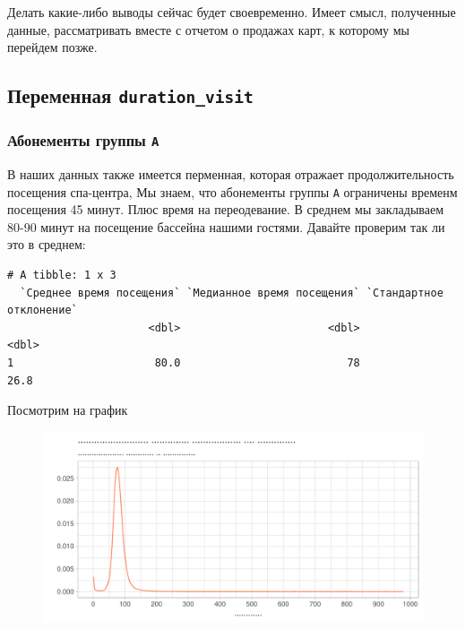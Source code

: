\documentclass[
  letterpaper,
  DIV=11,
  numbers=noendperiod]{scrartcl}
\begin{document}
Делать какие-либо выводы сейчас будет своевременно. Имеет смысл,
полученные данные, рассматривать вместе с отчетом о продажах карт, к
которому мы перейдем позже.

\hypertarget{ux43fux435ux440ux435ux43cux435ux43dux43dux430ux44f-duration_visit}{%
\subsection*{\texorpdfstring{Переменная
\texttt{duration\_visit}}{Переменная duration\_visit}}\label{ux43fux435ux440ux435ux43cux435ux43dux43dux430ux44f-duration_visit}}

\hypertarget{ux430ux431ux43eux43dux435ux43cux435ux43dux442ux44b-ux433ux440ux443ux43fux43fux44b-ux430}{%
\subsubsection*{\texorpdfstring{Абонементы группы
\texttt{А}}{Абонементы группы А}}\label{ux430ux431ux43eux43dux435ux43cux435ux43dux442ux44b-ux433ux440ux443ux43fux43fux44b-ux430}}

В наших данных также имеется перменная, которая отражает
продолжительность посещения спа-центра, Мы знаем, что абонементы группы
\texttt{А} ограничены временм посещения 45 минут. Плюс время на
переодевание. В среднем мы закладываем 80-90 минут на посещение бассейна
нашими гостями. Давайте проверим так ли это в среднем:

\begin{verbatim}
# A tibble: 1 x 3
  `Среднее время посещения` `Медианное время посещения` `Стандартное отклонение`
                      <dbl>                       <dbl>                    <dbl>
1                      80.0                          78                     26.8
\end{verbatim}

Посмотрим на график

\begin{figure}

{\centering \includegraphics{./intro_files/figure-pdf/unnamed-chunk-20-1.pdf}

}

\end{figure}
\end{document}
